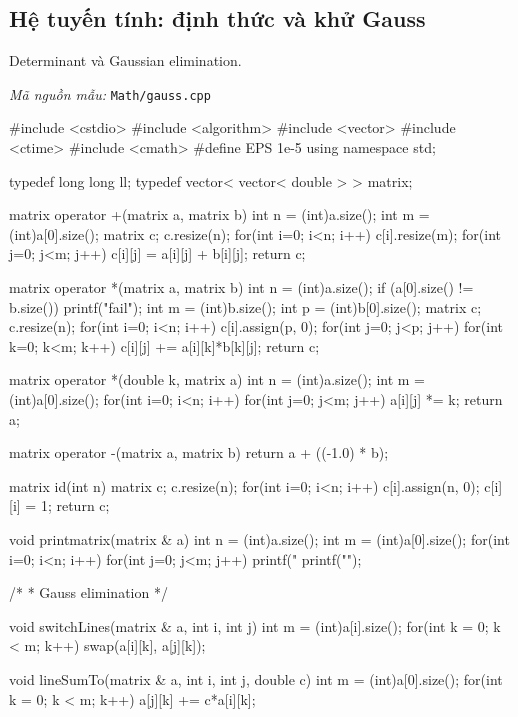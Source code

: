 \documentclass[11pt]{article}
\newcommand{\codepath}[1]{\par\noindent\textit{Mã nguồn mẫu:} \texttt{#1}\par}
\begin{document}
\subsection{Hệ tuyến tính: định thức và khử Gauss}

Determinant và Gaussian elimination.

\codepath{Math/gauss.cpp}

\begingroup\scriptsize
\begin{vncode}
#include <cstdio>
#include <algorithm>
#include <vector>
#include <ctime>
#include <cmath>
#define EPS 1e-5
using namespace std;

typedef long long ll;
typedef vector< vector< double > > matrix;

matrix operator +(matrix a, matrix b) {
	int n = (int)a.size();
	int m = (int)a[0].size();
	matrix c;
	c.resize(n);
	for(int i=0; i<n; i++) {
		c[i].resize(m);
		for(int j=0; j<m; j++) {
			c[i][j] = a[i][j] + b[i][j];
		}
	}
	return c;
}

matrix operator *(matrix a, matrix b) {
	int n = (int)a.size();
	if (a[0].size() != b.size()) printf("fail\n");
	int m = (int)b.size();
	int p = (int)b[0].size();
	matrix c;
	c.resize(n);
	for(int i=0; i<n; i++) {
		c[i].assign(p, 0);
		for(int j=0; j<p; j++) {
			for(int k=0; k<m; k++) {
				c[i][j] += a[i][k]*b[k][j];
			}
		}
	}
	return c;
}

matrix operator *(double k, matrix a) {
	int n = (int)a.size();
	int m = (int)a[0].size();
	for(int i=0; i<n; i++) {
		for(int j=0; j<m; j++) {
			a[i][j] *= k;
		}
	}
	return a;
}

matrix operator -(matrix a, matrix b) {
	return a + ((-1.0) * b);
}

matrix id(int n) {
	matrix c; c.resize(n);
	for(int i=0; i<n; i++) {
		c[i].assign(n, 0);
		c[i][i] = 1;
	}
	return c;
}

void printmatrix(matrix & a) {
	int n = (int)a.size();
	int m = (int)a[0].size();
	for(int i=0; i<n; i++) {
		for(int j=0; j<m; j++) {
			printf("%
		}
		printf("\n");
	}
}

/*
 * Gauss elimination
 */

void switchLines(matrix & a, int i, int j) {
	int m = (int)a[i].size();
	for(int k = 0; k < m; k++) swap(a[i][k], a[j][k]);
}

void lineSumTo(matrix & a, int i, int j, double c) {
	int m = (int)a[0].size();
	for(int k = 0; k < m; k++) a[j][k] += c*a[i][k];
}


\end{vncode}
\end{document}
